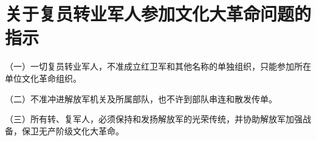 \section[关于复员转业军人参加文化大革命问题的指示（一九六六年十二月）]{关于复员转业军人参加文化大革命问题的指示}


（一）一切复员转业军人，不准成立红卫军和其他名称的单独组织，只能参加所在单位文化革命组织。

（二）不准冲进解放军机关及所属部队，也不许到部队串连和散发传单。

（三）所有转、复军人，必须保持和发扬解放军的光荣传统，并协助解放军加强战备，保卫无产阶级文化大革命。

